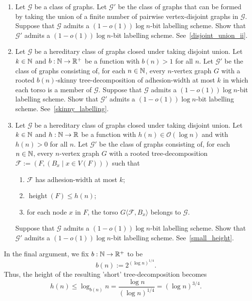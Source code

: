 \documentclass{patmorin}
\renewcommand{\le}{\leqslant}
\renewcommand{\leq}{\leqslant}
\newcommand{\torso}[2]{{#1}\langle{#2}\rangle}
\DeclareMathOperator{\height}{height}
\newcommand{\Oh}{\mathcal{O}}
\begin{document}
\begin{enumerate}[label=\rm(2\alph*)]
\item \label{step:union-closed}
Let $\mathcal{G}$ be a class of graphs.
Let $\mathcal{G}'$ be the class of graphs that can be formed by taking the union of a finite number of pairwise vertex-disjoint graphs in $\mathcal{G}$.
    Suppose that $\mathcal{G}$ admits a $(1-o(1))\log n$-bit labelling scheme.
    Show that $\mathcal{G}'$ admits a $(1-o(1))\log n$-bit labelling scheme. See~\cref{disjoint_union_ii}.
\item \label{step:skinny-tree-decomposition}
Let $\mathcal{G}$ be a hereditary class of graphs closed under taking disjoint union.
    Let $k\in\mathbb{N}$ and $b:\mathbb{N}\to\mathbb{R}^+$ be a function with $b(n)>1$ for all $n$.
    Let $\mathcal{G}'$ be the class of graphs consisting of, for each $n\in\mathbb{N}$, every $n$-vertex graph $G$ with a rooted $b(n)$-skinny tree-decomposition of adhesion-width at most $k$ in which each torso is a member of $\mathcal{G}$.
    Suppose that $\mathcal{G}$ admits a $(1-o(1))\log n$-bit labelling scheme.
    Show that $\mathcal{G}'$ admits a $(1-o(1))\log n$-bit labelling scheme. See~\cref{skinny_labelling}.
\item \label{step:short-tree-decompositions}
Let $\mathcal{G}$ be a hereditary class of graphs closed under taking disjoint union.
Let $k\in\mathbb{N}$ and  $h:\mathbb{N}\to\mathbb{R}$ be a function with $h(n)\in \Oh(\log n)$ and with $h(n)>0$ for all $n$.
Let $\mathcal{G'}$ be the class of graphs consisting of, for each $n\in\mathbb{N}$, every $n$-vertex graph $G$ with a rooted tree-decomposition $\mathcal{F}:=(F,(B_x \mid x\in V(F)))$ such that
    \begin{enumerate}[nosep,nolistsep,label=(\rm{\roman*)}]
      \item $\mathcal{F}$ has adhesion-width at most $k$;
      \item $\height(F)\le h(n)$;
      \item for each node $x$ in $F$, the torso $\torso{G}{\mathcal{F},B_x}$ belongs to $\mathcal{G}$.
    \end{enumerate}
    Suppose that $\mathcal{G}$ admits a $(1-o(1))\log n$-bit labelling scheme.
    Show that $\mathcal{G}'$ admits a $(1-o(1))\log n$-bit labelling scheme. See~\cref{small_height}.
\end{enumerate}

In the final argument, we fix $b:\mathbb{N}\to\mathbb{R}^+$ to be
\[
b(n):= 2^{(\log n)^{1/4}}.
\]
Thus, the height of the resulting 'short' tree-decomposition becomes
\[
h(n) \leq \log_{b(n)}n = \frac{\log n}{(\log n)^{1/4}} = (\log n)^{3/4}.
\]
\end{document}
